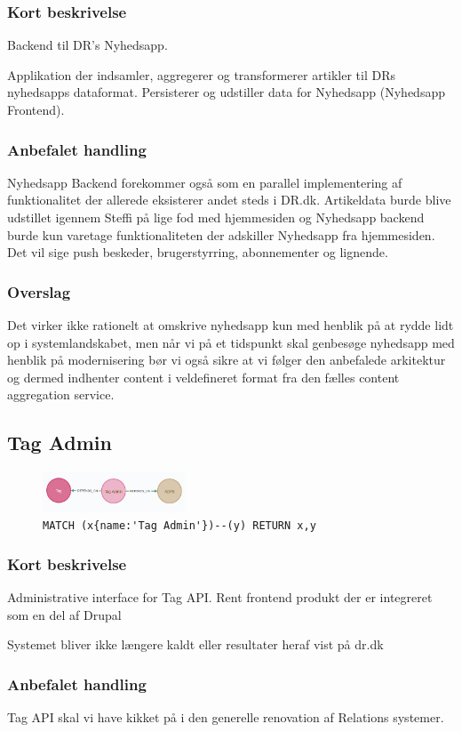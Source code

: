 \documentclass{article}
\begin{document}
\subsubsection*{Kort beskrivelse}
Backend til DR's Nyhedsapp.	

Applikation der indsamler, aggregerer og transformerer artikler til DRs nyhedsapps dataformat. Persisterer og udstiller data for Nyhedsapp (Nyhedsapp Frontend).
\subsubsection*{Anbefalet handling}
Nyhedsapp Backend forekommer også som en parallel implementering af funktionalitet der allerede eksisterer andet steds i DR.dk. 
Artikeldata burde blive udstillet igennem Steffi på lige fod med hjemmesiden og Nyhedsapp backend burde kun varetage funktionaliteten der adskiller Nyhedsapp fra hjemmesiden. Det vil sige push beskeder, brugerstyrring, abonnementer og lignende. 
\subsubsection*{Overslag}
Det virker ikke rationelt at omskrive nyhedsapp kun med henblik på at rydde lidt op i systemlandskabet, men når vi på et tidspunkt skal genbesøge nyhedsapp med henblik på modernisering bør vi også sikre at vi følger den anbefalede arkitektur og dermed indhenter content i veldefineret format fra den fælles content aggregation service.

\subsection{Tag Admin}
\begin{figure}[H]
\includegraphics[width=120pt]{TagAdmin.PNG}
\cprotect\caption{\verb|MATCH (x{name:'Tag Admin'})--(y) RETURN x,y|}
\end{figure}
\subsubsection*{Kort beskrivelse}
Administrative interface for Tag API.
Rent frontend produkt der er integreret som en del af Drupal

Systemet bliver ikke længere kaldt eller resultater heraf vist på dr.dk
\subsubsection*{Anbefalet handling}
Tag API skal vi have kikket på i den generelle renovation af Relations systemer.
\end{document}
